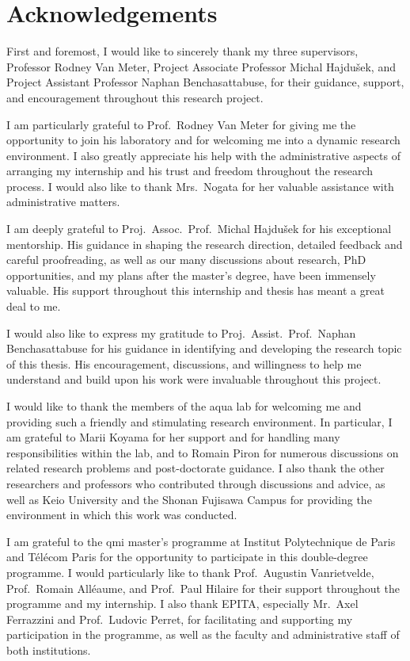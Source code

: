 \chapter*{Acknowledgements}

First and foremost, I would like to sincerely thank my three supervisors, Professor Rodney Van Meter, Project Associate Professor Michal Hajdušek, and Project Assistant Professor Naphan Benchasattabuse, for their guidance, support, and encouragement throughout this research project.

I am particularly grateful to Prof.\ Rodney Van Meter for giving me the opportunity to join his laboratory and for welcoming me into a dynamic research environment. I also greatly appreciate his help with the administrative aspects of arranging my internship and his trust and freedom throughout the research process. I would also like to thank Mrs.\ Nogata for her valuable assistance with administrative matters.

I am deeply grateful to Proj.\ Assoc.\ Prof.\ Michal Hajdušek for his exceptional mentorship. His guidance in shaping the research direction, detailed feedback and careful proofreading, as well as our many discussions about research, PhD opportunities, and my plans after the master's degree, have been immensely valuable. His support throughout this internship and thesis has meant a great deal to me.

I would also like to express my gratitude to Proj.\ Assist.\ Prof.\ Naphan Benchasattabuse for his guidance in identifying and developing the research topic of this thesis. His encouragement, discussions, and willingness to help me understand and build upon his work were invaluable throughout this project.

I would like to thank the members of the \gls{aqua} lab for welcoming me and providing such a friendly and stimulating research environment. In particular, I am grateful to Marii Koyama for her support and for handling many responsibilities within the lab, and to Romain Piron for numerous discussions on related research problems and post-doctorate guidance. I also thank the other researchers and professors who contributed through discussions and advice, as well as Keio University and the Shonan Fujisawa Campus for providing the environment in which this work was conducted.

I am grateful to the \gls{qmi} master's programme at Institut Polytechnique de Paris and Télécom Paris for the opportunity to participate in this double-degree programme. I would particularly like to thank Prof.\ Augustin Vanrietvelde, Prof.\ Romain Alléaume, and Prof.\ Paul Hilaire for their support throughout the programme and my internship. I also thank EPITA, especially Mr.\ Axel Ferrazzini and Prof.\ Ludovic Perret, for facilitating and supporting my participation in the programme, as well as the faculty and administrative staff of both institutions.

